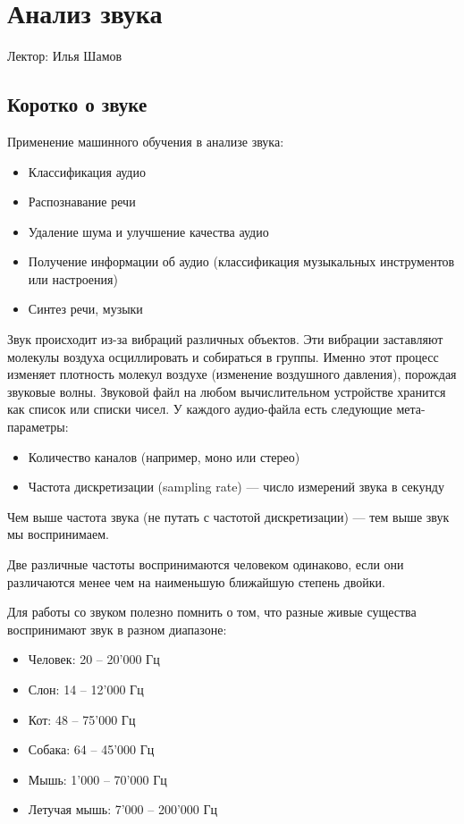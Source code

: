 \chapter{Анализ звука}

Лектор: Илья Шамов

\section{Коротко о звуке}

Применение машинного обучения в анализе звука:
\begin{itemize}
    \item Классификация аудио
    \item Распознавание речи
    \item Удаление шума и улучшение качества аудио
    \item Получение информации об аудио (классификация музыкальных инструментов или настроения)
    \item Синтез речи, музыки
\end{itemize}

Звук происходит из-за вибраций различных объектов. Эти вибрации заставляют молекулы воздуха осциллировать и собираться в группы. Именно этот процесс изменяет плотность молекул воздухе (изменение воздушного давления), порождая звуковые волны.\newline
Звуковой файл на любом вычислительном устройстве хранится как список или списки чисел. У каждого аудио-файла есть следующие мета-параметры:
\begin{itemize}
    \item Количество каналов (например, моно или стерео)
    \item Частота дискретизации (sampling rate) --- число измерений звука в секунду
\end{itemize}

\begin{remark}
    Чем выше частота звука (не путать с частотой дискретизации) --- тем выше звук мы воспринимаем.
\end{remark}

\begin{remark}
    Две различные частоты воспринимаются человеком одинаково, если они различаются менее чем на наименьшую ближайшую степень двойки.
\end{remark}

Для работы со звуком полезно помнить о том, что разные живые существа воспринимают звук в разном диапазоне:
\begin{itemize}
    \item Человек: 20 -- 20'000 Гц
    \item Слон: 14 -- 12'000 Гц
    \item Кот: 48 -- 75'000 Гц
    \item Собака: 64 -- 45'000 Гц
    \item Мышь: 1'000 -- 70'000 Гц
    \item Летучая мышь: 7'000 -- 200'000 Гц
\end{itemize}

